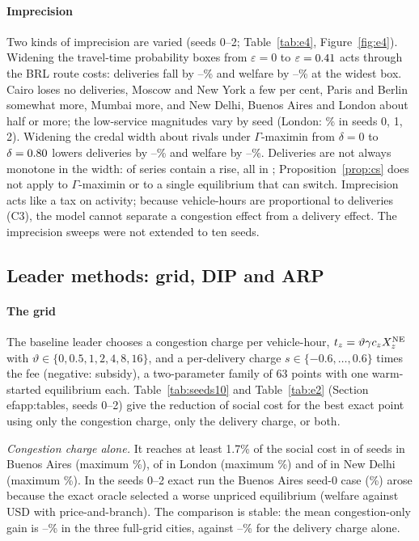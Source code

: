 \documentclass[preprint,11pt]{elsarticle}
\theoremstyle{definition}
\theoremstyle{remark}
\begin{document}
\paragraph{Imprecision} Two kinds of imprecision are varied (seeds 0--2; Table~\ref{tab:e4}, Figure~\ref{fig:e4}). Widening the travel-time probability boxes from $\varepsilon=0$ to $\varepsilon=0.41$ acts through the BRL route costs: deliveries fall by \EfourPbDelMin--\EfourPbDelMax\% and welfare by \EfourPbWMin--\EfourPbWMax\% at the widest box. Cairo loses no deliveries, Moscow and New York a few per cent, Paris and Berlin somewhat more, Mumbai more, and New Delhi, Buenos Aires and London about half or more; the low-service magnitudes vary by seed (London: \EfourLondonPb\% in seeds 0, 1, 2). Widening the credal width about rivals under $\Gamma$-maximin from $\delta=0$ to $\delta=0.80$ lowers deliveries by \EfourGaDelMin--\EfourGaDelMax\% and welfare by \EfourGaWMin--\EfourGaWMax\%. Deliveries are not always monotone in the width: \EfourNonMonoN{} of \EfourSeries{} series contain a rise, all in \EfourNonMonoCities; Proposition~\ref{prop:cs} does not apply to $\Gamma$-maximin or to a single equilibrium that can switch. Imprecision acts like a tax on activity; because vehicle-hours are proportional to deliveries (C3), the model cannot separate a congestion effect from a delivery effect. The imprecision sweeps were not extended to ten seeds.

\subsection{Leader methods: grid, DIP and ARP}\label{sec:res-leader}

\paragraph{The grid} The baseline leader chooses a congestion charge per vehicle-hour, $t_z=\vartheta\gamma c_zX_z^{\rm NE}$ with $\vartheta\in\{0,0.5,1,2,4,8,16\}$, and a per-delivery charge $s\in\{-0.6,\dots,0.6\}$ times the fee (negative: subsidy), a two-parameter family of 63 points with one warm-started equilibrium each. Table~\ref{tab:seeds10} and Table~\ref{tab:e2} (Section~
ef{app:tables}, seeds 0--2) give the reduction of social cost for the best exact point using only the congestion charge, only the delivery charge, or both.

\emph{Congestion charge alone.} It reaches at least 1.7\% of the social cost in \TenCongHiBuenosAires{} of \TenNBuenosAires{} seeds in Buenos Aires (maximum \TenCongMaxBuenosAires\%), \TenCongHiLondon{} of \TenNLondon{} in London (maximum \TenCongMaxLondon\%) and \TenCongHiNewDelhi{} of \TenNNewDelhi{} in New Delhi (maximum \TenCongMaxNewDelhi\%). In the seeds 0--2 exact run the Buenos Aires seed-0 case (\EtwoCongMax\%) arose because the exact oracle selected a worse unpriced equilibrium (welfare \ExBAWNew{} against \ExBAWOld{} USD with price-and-branch). The comparison is stable: the mean congestion-only gain is \TenCongMeanMin--\TenCongMeanMax\% in the three full-grid cities, against \TenDelMeanMin--\TenDelMeanMax\% for the delivery charge alone.
\end{document}
